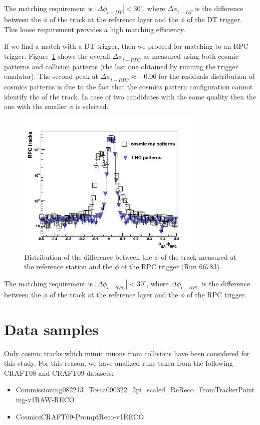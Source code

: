 The matching requirement is $|\Delta\phi_{t-DT}| < 30^\circ$,
where $\Delta\phi_{t-DT}$ is the difference 
between the $\phi$ of the track at the reference layer and
the $\phi$ of the DT trigger. This loose requirement
provides a high matching efficiency.

If we find a match with a DT trigger, then we proceed
for matching to an RPC trigger. 
Figure~\ref{fig:trigger_residuals} shows the overall $\Delta\phi_{t-RPC}$ as measured 
using both cosmic patterns and collision patterns (the
last one obtained by running the trigger emulator).
The second peak at $\Delta\phi_{t-RPC} \approx -0.06$ for the residuals distribution 
of cosmics patterns is due to the fact that the cosmics 
pattern configuration cannot identify the \pt of the track.
In case of two candidates with the same quality then the one
with the smaller $\phi$ is selected.

\begin{figure}[hbtp]
  \begin{center}
    \includegraphics[width=0.8\textwidth]{residuals_rpc}
    \hspace{1cm}
    \caption{Distribution of the difference between the $\phi$ of the track measured 
    at the reference station and the $\phi$ of the RPC trigger (Run 66783).}
    \label{fig:trigger_residuals}
  \end{center}
\end{figure}

The matching requirement is $|\Delta\phi_{t-RPC}| < 30^\circ$,
where $\Delta\phi_{t-RPC}$ is the difference 
between the $\phi$ of the track at the reference layer 
and the $\phi$ of the RPC trigger.

\section{Data samples}
Only cosmic tracks which mimic muons from collisions
have been considered for this study. 
For this reason, we have analized runs taken from the 
following CRAFT08 and CRAFT09 datasets:
\begin{itemize}
\item
Commissioning08\/2213\_Tosca090322\_2pi\_scaled\_ReReco\_FromTrackerPointing-v1\/RAW-RECO
\item
Cosmics\/CRAFT09-PromptReco-v1\/RECO
\end{itemize}

